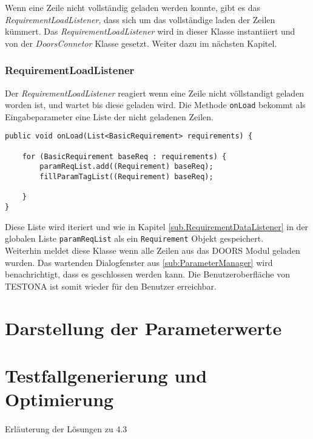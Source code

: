 Wenn eine Zeile nicht vollständig geladen werden konnte, gibt es das \textit{RequirementLoadListener}, dass sich um das vollständige laden der Zeilen kümmert. Das \textit{RequirementLoadListener} wird in dieser Klasse instantiiert und von der \textit{DoorsConnetor} Klasse gesetzt. Weiter dazu im nächsten Kapitel.


\subsubsection{RequirementLoadListener}\label{sub.RequirementLoadListener}
Der \textit{RequirementLoadListener} reagiert wenn eine Zeile nicht völlstandigt geladen worden ist, und wartet bis diese geladen wird. Die Methode \texttt{onLoad} bekommt als Eingabeparameter eine Liste der nicht geladenen Zeilen.

\begin{lstlisting}[caption={Nachladen der Parametertabelle nach Zeilen}, captionpos=b]
public void onLoad(List<BasicRequirement> requirements) {

	for (BasicRequirement baseReq : requirements) {
		paramReqList.add((Requirement) baseReq);
		fillParamTagList((Requirement) baseReq);
		
	}
}
\end{lstlisting}

Diese Liste wird iteriert und wie in Kapitel \ref{sub.RequirementDataListener} in der globalen Liste \texttt{paramReqList} als ein \texttt{Requirement} Objekt gespeichert.\\

Weiterhin meldet diese Klasse wenn alle Zeilen aus das DOORS Modul geladen wurden. Das wartenden Dialogfenster aus \ref{sub:ParameterManager} wird benachrichtigt, dass es geschlossen werden kann. Die Benutzeroberfläche von TESTONA ist somit wieder für den Benutzer erreichbar.



\newpage
\section{Darstellung der Parameterwerte}\label{sec.LoesungVisualisierung}
\paragraph{}



\newpage
\section{Testfallgenerierung und Optimierung}
\paragraph{}
Erläuterung der Lösungen zu 4.3